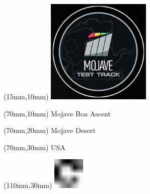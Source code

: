 \null\newpage
\begin{textblock*}{50mm}(15mm,10mm)%
\includegraphics[width=50mm]{LG/MOJA.png}
\end{textblock*}
\begin{textblock*}{130mm}(70mm,10mm)%
{\fontsize{20}{20}\selectfont Mojave Boa Ascent}\\
\end{textblock*}
\begin{textblock*}{120mm}(70mm,20mm)%
{\fontsize{16}{16}\selectfont Mojave Desert}\\
\end{textblock*}
\begin{textblock*}{120mm}(70mm,30mm)%
{\fontsize{12}{12}\selectfont USA}
\end{textblock*}
\begin{textblock*}{30mm}(110mm,30mm)%
\centering
\includegraphics[height=15mm]{icons/fa-rotate-right.pdf}
\end{textblock*}
